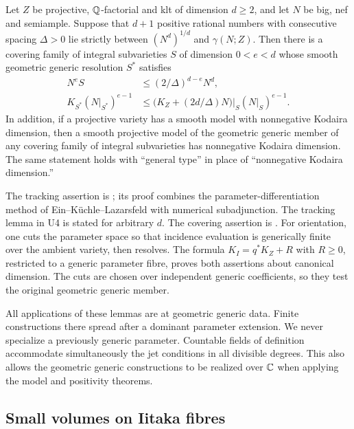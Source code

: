 \begin{lemma}
\label{lem:tracking-input}
Let $Z$ be projective, $\mathbb Q$-factorial and klt of dimension $d\ge2$,
and let $N$ be big, nef and semiample.  Suppose that $d+1$ positive
rational numbers with consecutive spacing $\Delta>0$ lie strictly
between $(N^d)^{1/d}$ and $\gamma(N;Z)$.  Then there is a covering
family of integral subvarieties $S$ of dimension $0<e<d$ whose
smooth geometric generic resolution $S^*$ satisfies
\begin{align}
 N^eS&\le(2/\Delta)^{d-e}N^d,\label{eq:tracking-degree}\\
 K_{S^*}(N|_{S^*})^{e-1}
 &\le\bigl(K_Z+(2d/\Delta)N\bigr)|_S(N|_S)^{e-1}.
 \label{eq:tracking-canonical}
\end{align}
In addition, if a projective variety has a smooth model with
nonnegative Kodaira dimension, then a smooth projective model of
the geometric generic member of any covering family of integral
subvarieties has nonnegative Kodaira dimension.
The same statement holds with ``general type'' in place of
``nonnegative Kodaira dimension.''
\end{lemma}

The tracking assertion is
\cite[Lemma 6.3]{U4};
its proof combines the parameter-differentiation method of
Ein--K\"uchle--Lazarsfeld
\cite[Proposition~2.3]{EinKuchleLazarsfeld1995} with numerical
subadjunction.  The tracking lemma in U4 is stated for arbitrary $d$.
The covering assertion is
\cite[Lemma 6.4]{U4}.
For orientation, one cuts the parameter space so that incidence
evaluation is generically finite over the ambient variety, then
resolves.  The formula $K_I=q^*K_Z+R$ with $R\ge0$, restricted to
a generic parameter fibre, proves both assertions about canonical
dimension.  The cuts are chosen over independent generic coefficients,
so they test the original geometric generic member.

All applications of these lemmas are at geometric generic data.
Finite constructions there spread after a dominant parameter
extension.  We never specialize a previously generic parameter.
Countable fields of definition accommodate simultaneously the jet
conditions in all divisible degrees.  This also allows the geometric
generic constructions to be realized over $\mathbb C$ when applying the
model and positivity theorems.

\subsection{Small volumes on Iitaka fibres}

